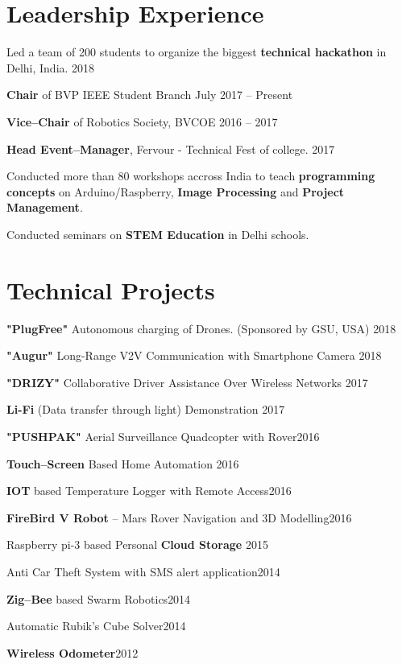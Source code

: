 \section{Leadership Experience}
\begin{innerlist}
    \item Led a team of 200 students to organize the biggest \textbf{technical hackathon} in Delhi, India. \hfill {2018}
    \item \textbf{Chair} of BVP IEEE Student Branch \hfill {July 2017 -- Present}
    \item \textbf{Vice--Chair} of Robotics Society, BVCOE \hfill {2016 -- 2017}
    \item \textbf{Head Event--Manager}, Fervour - Technical Fest of college. \hfill {2017}
    \item Conducted more than 80 workshops accross India to teach \textbf{programming concepts} on Arduino/Raspberry, \textbf{Image Processing} and \textbf{Project Management}.
    \item Conducted seminars on \textbf{STEM Education} in Delhi schools.
\end{innerlist}

\halfblankline

\section{Technical Projects}
\begin{innerlist}
    \item \textbf{"PlugFree"} Autonomous charging of Drones. (Sponsored by GSU, USA) \hfill {2018}
    \item \textbf{"Augur"} Long-Range V2V Communication with Smartphone Camera \hfill {2018}
    \item \textbf{"DRIZY"} Collaborative Driver Assistance Over Wireless Networks \hfill {2017}
    \item \textbf{Li-Fi} (Data transfer through light) Demonstration \hfill {2017}
    \item \textbf{"PUSHPAK"} Aerial Surveillance Quadcopter with Rover\hfill {2016}
    \item \textbf{Touch--Screen} Based Home Automation \hfill {2016}
    \item \textbf{IOT} based Temperature Logger with Remote Access\hfill {2016}
    \item \textbf{FireBird V Robot} -- Mars Rover Navigation and 3D Modelling\hfill {2016}
    \item Raspberry pi-3 based Personal \textbf{Cloud Storage} \hfill {2015}
    \item Anti Car Theft System with SMS alert application\hfill {2014}
    \item \textbf{Zig--Bee} based Swarm Robotics\hfill {2014}
    \item Automatic Rubik’s Cube Solver\hfill {2014}
    \item \textbf{Wireless Odometer}\hfill {2012}
\end{innerlist}

